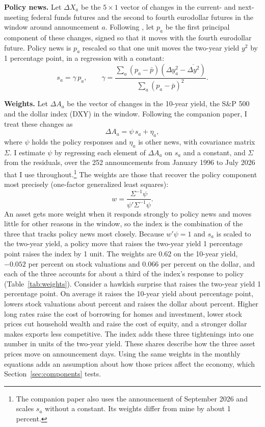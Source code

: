 \documentclass[11pt]{article}
\begin{document}
\textbf{Policy news.} Let $\Delta X_a$ be the $5\times 1$ vector of changes in the current- and next-meeting federal funds futures and the second to fourth eurodollar futures in the window around announcement $a$. Following \citet{nakamura2018}, let $p_a$ be the first principal component of these changes, signed so that it moves with the fourth eurodollar future. Policy news is $p_a$ rescaled so that one unit moves the two-year yield $y^{2}$ by 1 percentage point, in a regression with a constant:
\begin{equation}
s_a = \gamma\, p_a, \qquad \gamma = \frac{\sum_a (p_a-\bar p)(\Delta y^{2}_a-\overline{\Delta y^{2}})}{\sum_a (p_a-\bar p)^{2}}. \label{eq:ns}
\end{equation}

\textbf{Weights.} Let $\Delta A_a$ be the vector of changes in the 10-year yield, the S\&P 500 and the dollar index (DXY) in the window. Following the companion paper, I treat these changes as
\begin{equation}
\Delta A_a = \psi\, s_a + \eta_a, \label{eq:window}
\end{equation}
where $\psi$ holds the policy responses and $\eta_a$ is other news, with covariance matrix $\Sigma$. I estimate $\psi$ by regressing each element of $\Delta A_a$ on $s_a$ and a constant, and $\Sigma$ from the residuals, over the 252 announcements from January 1996 to July 2026 that I use throughout.\footnote{The companion paper also uses the announcement of September 2026 and scales $s_a$ without a constant. Its weights differ from mine by about 1 percent.} The weights are those that recover the policy component most precisely (one-factor generalized least squares):
\begin{equation}
w = \frac{\Sigma^{-1}\psi}{\psi'\Sigma^{-1}\psi}. \label{eq:weights}
\end{equation}
An asset gets more weight when it responds strongly to policy news and moves little for other reasons in the window, so the index is the combination of the three that tracks policy news most closely. Because $w'\psi=1$ and $s_a$ is scaled to the two-year yield, a policy move that raises the two-year yield 1 percentage point raises the index by 1 unit. The weights are 0.62 on the 10-year yield, $-0.052$ per percent on stock valuations and 0.066 per percent on the dollar, and each of the three accounts for about a third of the index's response to policy (Table~\ref{tab:weights}). Consider a hawkish surprise that raises the two-year yield 1 percentage point. On average it raises the 10-year yield about  percentage point, lowers stock valuations about  percent and raises the dollar about  percent. Higher long rates raise the cost of borrowing for homes and investment, lower stock prices cut household wealth and raise the cost of equity, and a stronger dollar makes exports less competitive. The index adds these three tightenings into one number in units of the two-year yield. These shares describe how the three asset prices move on announcement days. Using the same weights in the monthly equations adds an assumption about how those prices affect the economy, which Section~\ref{sec:components} tests.
\end{document}
